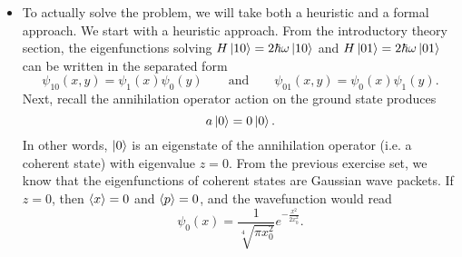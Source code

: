 \documentclass[11pt, a4paper]{article}
\newcommand{\eqtext}[1]{\qquad \text{#1} \qquad}
\begin{document}
\begin{itemize}
	\item To actually solve the problem, we will take both a heuristic and a formal approach. We start with a heuristic approach. From the introductory theory section, the eigenfunctions solving $ H \ket{10} = 2\hbar \omega \ket{10}$ and $ H \ket{01} = 2\hbar \omega \ket{01}$ can be written in the separated form
	\begin{equation*}
		\psi_{10}(x, y) = \psi_{1}(x)\psi_{0}(y) \eqtext{and} \psi_{01}(x, y) = \psi_{0}(x)\psi_{1}(y).
	\end{equation*}
%	
	Next, recall the annihilation operator action on the ground state produces
	\begin{equation*}
		a \ket{0} = 0 \ket{0}.
	\end{equation*}
	In other words, $ \ket{0} $ is an eigenstate of the annihilation operator (i.e. a coherent state) with eigenvalue $ z = 0 $. From the previous exercise set, we know that the eigenfunctions of coherent states are Gaussian wave packets. If $ z = 0 $, then $ \ev{x} = 0 $ and $ \ev{p} = 0 $, and the wavefunction would read
	\begin{equation*}
		\psi_{0}(x) = \frac{1}{\sqrt[4]{\pi x_{0}^{2}}}e^{-\frac{x^{2}}{2x_{0}^{2}}}.
	\end{equation*}


\end{itemize}
\end{document}
